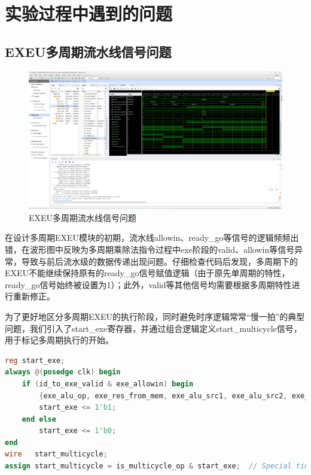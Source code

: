 \documentclass[11pt]{article}
\begin{document}
\section{实验过程中遇到的问题}

\subsection{EXEU多周期流水线信号问题}

\begin{figure}[H]
  \centering
  \includegraphics[width=\textwidth]{fig/exeu_multicycle_error.png}
  \caption{EXEU多周期流水线信号问题}
  \label{fig:exeu_multicycle_error}
\end{figure}

在设计多周期EXEU模块的初期，流水线allowin、ready\_go等信号的逻辑频频出错，在波形图中反映为多周期乘除法指令过程中exe阶段的valid、allowin等信号异常，导致与前后流水级的数据传递出现问题。仔细检查代码后发现，多周期下的EXEU不能继续保持原有的ready\_go信号赋值逻辑（由于原先单周期的特性，ready\_go信号始终被设置为1）；此外，valid等其他信号均需要根据多周期特性进行重新修正。

为了更好地区分多周期EXEU的执行阶段，同时避免时序逻辑常常“慢一拍”的典型问题，我们引入了start\_exe寄存器，并通过组合逻辑定义start\_multicycle信号，用于标记多周期执行的开始。

\begin{lstlisting}[language=verilog]
reg start_exe;
always @(posedge clk) begin
    if (id_to_exe_valid & exe_allowin) begin
        {exe_alu_op, exe_res_from_mem, exe_alu_src1, exe_alu_src2, exe_mem_op, exe_rf_we, exe_rf_waddr, exe_rkd_value, exe_pc} <= id_to_exe_zip;
        start_exe <= 1'b1;
    end else
        start_exe <= 1'b0;
end
wire   start_multicycle;
assign start_multicycle = is_multicycle_op & start_exe;  // Special time stamp
\end{lstlisting}
\end{document}
